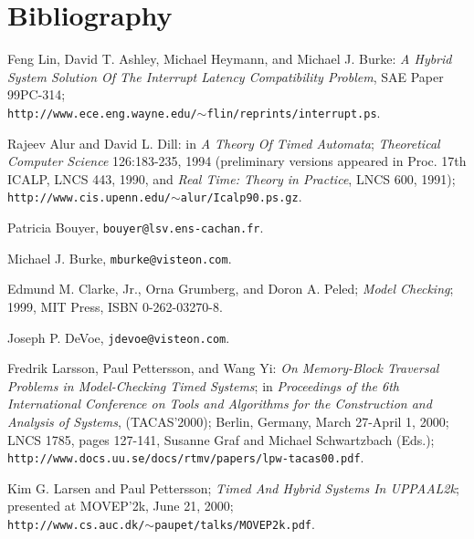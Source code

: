 %
\section{Bibliography}
\label{sbib0}


\begin{thebibliography}{99}
 Feng Lin,
   David T. Ashley, Michael Heymann, and Michael
   J. Burke:  \emph{A Hybrid System Solution Of The
   Interrupt Latency Compatibility Problem}, SAE
   Paper 99PC-314; \\
   \texttt{http://www.ece.eng.wayne.edu/$\sim$flin/reprints/interrupt.ps}.

 Rajeev Alur and 
   David L. Dill:  in \emph{A Theory Of Timed Automata}; 
   \emph{Theoretical Computer Science} 126:183-235, 1994 
   (preliminary versions appeared in Proc. 17th ICALP, LNCS 443, 1990, 
   and \emph{Real Time: Theory in Practice}, LNCS 600, 1991);\\
   \texttt{http://www.cis.upenn.edu/$\sim$alur/Icalp90.ps.gz}.

Patricia Bouyer, 
   \texttt{bouyer@lsv.ens-cachan.fr}.

 Michael J. Burke, 
   \texttt{mburke@visteon.com}.

 Edmund M. Clarke, Jr.,
   Orna Grumberg, and Doron A. Peled; \emph{Model Checking};
   1999, MIT Press, ISBN 0-262-03270-8.

 Joseph P. DeVoe, 
   \texttt{jdevoe@visteon.com}.

 Fredrik Larsson, Paul
   Pettersson, and Wang Yi:  \emph{On Memory-Block Traversal Problems 
   in Model-Checking Timed Systems}; 
   in \emph{Proceedings of the 6th International Conference on Tools and Algorithms 
   for the Construction and Analysis of Systems}, (TACAS'2000); Berlin, Germany, 
   March 27-April 1, 2000; LNCS 1785, pages 127-141, Susanne Graf and Michael Schwartzbach 
   (Eds.);\\
   \texttt{http://www.docs.uu.se/docs/rtmv/papers/lpw-tacas00.pdf}.

 Kim G. Larsen and Paul Pettersson;
   \emph{Timed And Hybrid Systems In UPPAAL2k};
   presented at MOVEP'2k, June 21, 2000; \\
   \texttt{http://www.cs.auc.dk/$\sim$paupet/talks/MOVEP2k.pdf}.
\end{thebibliography}

